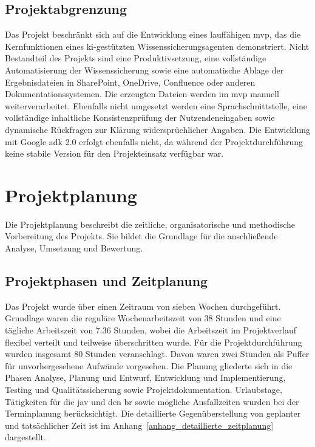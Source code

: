 \documentclass[
  10pt,
  ngerman,
  a4paper,
  toc=graduated,
  numbers=noenddot,
  headings=standardclasses,
  nonumberlist
]{scrartcl}
\begin{document}
\subsection{Projektabgrenzung}
\label{projektabgrenzung}
Das Projekt beschränkt sich auf die Entwicklung eines lauffähigen \gls{mvp}, das die Kernfunktionen eines \gls{ki}-gestützten Wissenssicherungsagenten demonstriert. Nicht Bestandteil des Projekts sind eine Produktivsetzung, eine vollständige Automatisierung der Wissenssicherung sowie eine automatische Ablage der Ergebnisdateien in SharePoint, OneDrive, Confluence oder anderen Dokumentationssystemen. Die erzeugten Dateien werden im \gls{mvp} manuell weiterverarbeitet. Ebenfalls nicht umgesetzt werden eine Sprachschnittstelle, eine vollständige inhaltliche Konsistenzprüfung der Nutzendeneingaben sowie dynamische Rückfragen zur Klärung widersprüchlicher Angaben. Die Entwicklung mit Google \gls{adk} 2.0 erfolgt ebenfalls nicht, da während der Projektdurchführung keine stabile Version für den Projekteinsatz verfügbar war.

\section{Projektplanung}
\label{projektplanung}
Die Projektplanung beschreibt die zeitliche, organisatorische und methodische Vorbereitung des Projekts. Sie bildet die Grundlage für die anschließende Analyse, Umsetzung und Bewertung.

\subsection{Projektphasen und Zeitplanung}
\label{projektphasen_und_zeitplanung}
Das Projekt wurde über einen Zeitraum von sieben Wochen durchgeführt. Grundlage waren die reguläre Wochenarbeitszeit von 38 Stunden und eine tägliche Arbeitszeit von 7:36 Stunden, wobei die Arbeitszeit im Projektverlauf flexibel verteilt und teilweise überschritten wurde. Für die Projektdurchführung wurden insgesamt 80 Stunden veranschlagt. Davon waren zwei Stunden als Puffer für unvorhergesehene Aufwände vorgesehen. Die Planung gliederte sich in die Phasen Analyse, Planung und Entwurf, Entwicklung und Implementierung, Testing und Qualitätssicherung sowie Projektdokumentation. Urlaubstage, Tätigkeiten für die \gls{jav} und den \gls{br} sowie mögliche Ausfallzeiten wurden bei der Terminplanung berücksichtigt. Die detaillierte Gegenüberstellung von geplanter und tatsächlicher Zeit ist im Anhang~\ref{anhang_detaillierte_zeitplanung} dargestellt.
\end{document}
